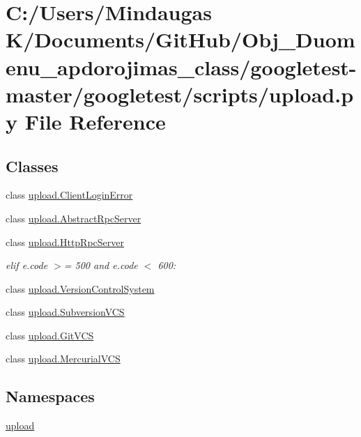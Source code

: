 \hypertarget{googletest-master_2googletest_2scripts_2upload_8py}{}\section{C\+:/\+Users/\+Mindaugas K/\+Documents/\+Git\+Hub/\+Obj\+\_\+\+Duomenu\+\_\+apdorojimas\+\_\+class/googletest-\/master/googletest/scripts/upload.py File Reference}
\label{googletest-master_2googletest_2scripts_2upload_8py}
\subsection*{Classes}
\begin{DoxyCompactItemize}
\item 
class \mbox{\hyperlink{classupload_1_1_client_login_error}{upload.\+Client\+Login\+Error}}
\item 
class \mbox{\hyperlink{classupload_1_1_abstract_rpc_server}{upload.\+Abstract\+Rpc\+Server}}
\item 
class \mbox{\hyperlink{classupload_1_1_http_rpc_server}{upload.\+Http\+Rpc\+Server}}
\begin{DoxyCompactList}\small\item\em elif e.\+code $>$= 500 and e.\+code $<$ 600\+: \end{DoxyCompactList}\item 
class \mbox{\hyperlink{classupload_1_1_version_control_system}{upload.\+Version\+Control\+System}}
\item 
class \mbox{\hyperlink{classupload_1_1_subversion_v_c_s}{upload.\+Subversion\+V\+CS}}
\item 
class \mbox{\hyperlink{classupload_1_1_git_v_c_s}{upload.\+Git\+V\+CS}}
\item 
class \mbox{\hyperlink{classupload_1_1_mercurial_v_c_s}{upload.\+Mercurial\+V\+CS}}
\end{DoxyCompactItemize}
\subsection*{Namespaces}
\begin{DoxyCompactItemize}
\item 
 \mbox{\hyperlink{namespaceupload}{upload}}
\end{DoxyCompactItemize}
